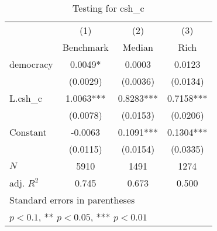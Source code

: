\begin{table}[htbp]\centering
\def\sym#1{\ifmmode^{#1}\else\(^{#1}\)\fi}
\caption{Testing for csh\_c \label{tab:regression1}}
\begin{tabular}{l*{3}{c}}
\hline\hline
            &\multicolumn{1}{c}{(1)}&\multicolumn{1}{c}{(2)}&\multicolumn{1}{c}{(3)}\\
            &\multicolumn{1}{c}{Benchmark}&\multicolumn{1}{c}{Median}&\multicolumn{1}{c}{Rich}\\
\hline
democracy   &      0.0049*  &      0.0003   &      0.0123   \\
            &    (0.0029)   &    (0.0036)   &    (0.0134)   \\
[1em]
L.csh\_c     &      1.0063***&      0.8283***&      0.7158***\\
            &    (0.0078)   &    (0.0153)   &    (0.0206)   \\
[1em]
Constant    &     -0.0063   &      0.1091***&      0.1304***\\
            &    (0.0115)   &    (0.0154)   &    (0.0335)   \\
\hline
\(N\)       &        5910   &        1491   &        1274   \\
adj. \(R^{2}\)&       0.745   &       0.673   &       0.500   \\
\hline\hline
\multicolumn{4}{l}{\footnotesize Standard errors in parentheses}\\
\multicolumn{4}{l}{\footnotesize * \(p<0.1\), ** \(p<0.05\), *** \(p<0.01\)}\\
\end{tabular}
\end{table}
